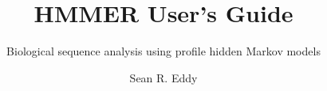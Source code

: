 \title{HMMER User's Guide}

\subtitle{Biological sequence analysis using profile hidden Markov models}

\author{Sean R. Eddy}


